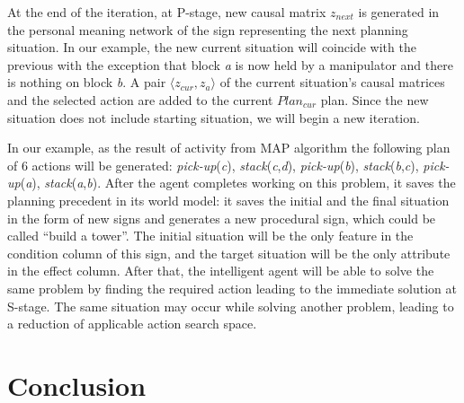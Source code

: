 \documentclass[review]{elsarticle}
\begin{document}
At the end of the iteration, at P-stage, new causal matrix $z_{next}$ is generated in the personal meaning network of the sign representing the next planning situation. In our example, the new current situation will coincide with the previous with the exception that block \textit{a} is now held by a manipulator and there is nothing on block \textit{b}. A pair $\langle z_{cur}, z_a \rangle$ of the current situation's causal matrices and the selected action are added to the current $Plan_{cur}$ plan. Since the new situation does not include starting situation, we will begin a new iteration.

In our example, as the result of activity from MAP algorithm the following plan of 6 actions will be generated: \textit{pick-up}(\textit{c}), \textit{stack}(\textit{c},\textit{d}), \textit{pick-up}(\textit{b}), \textit{stack}(\textit{b},\textit{c}), \textit{pick-up}(\textit{a}), \textit{stack}(\textit{a},\textit{b}). After the agent completes working on this problem, it saves the planning precedent in its world model: it saves the initial and the final situation in the form of new signs and generates a new procedural sign, which could be called ``build a tower''. The initial situation will be the only feature in the condition column of this sign, and the target situation will be the only attribute in the effect column. After that, the intelligent agent will be able to solve the same problem by finding the required action leading to the immediate solution at S-stage. The same situation may occur while solving another problem, leading to a reduction of applicable action search space.

	
\section{Conclusion}\label{sec:concl}
\end{document}
